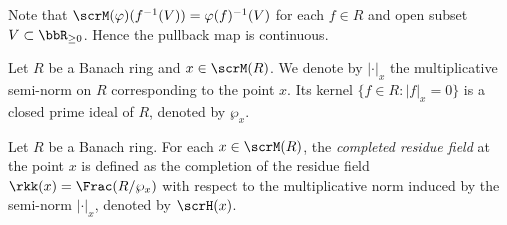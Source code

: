     Note that \(\scrM(\varphi)(f^{-1}(V)) = \varphi(f)^{-1}(V)\) for each \(f \in R\) and open subset \(V \subset \bbR_{\geq 0}\).
    Hence the pullback map is continuous.




    \begin{notation}\label{notation:norm_and_prime_ideal_associated_to_a_point_in_Berkovich_spectrum}
        Let \(R\) be a Banach ring and \(x \in \scrM(R)\).  
        We denote by \(|\cdot|_x\) the multiplicative semi-norm on \(R\) corresponding to the point \(x\).
        Its kernel \(\{f \in R : |f|_x = 0\}\) is a closed prime ideal of \(R\), denoted by \(\wp_x\).
    \end{notation}

    \begin{definition}\label{def:completed_residue_field}
        Let \(R\) be a Banach ring.
        For each \(x \in \scrM(R)\), the \emph{completed residue field} at the point \(x\) is defined as the completion of the residue field \(\rkk(x) = \Frac(R/\wp_x)\) with respect to the multiplicative norm induced by the semi-norm \(|\cdot|_x\), denoted by \(\scrH(x)\).
    \end{definition}

